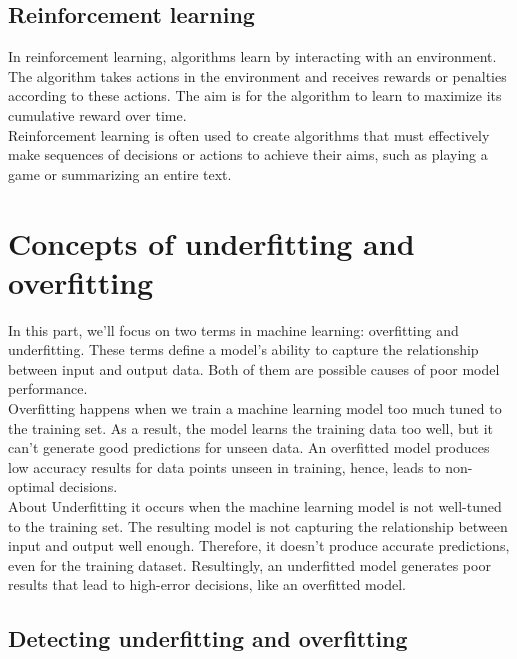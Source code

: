 \documentclass[
]{book}
\begin{document}
\hypertarget{reinforcement-learning}{%
\subsection*{Reinforcement learning}\label{reinforcement-learning}}

In reinforcement learning, algorithms learn by interacting with an environment. The algorithm takes actions in the environment and receives rewards or penalties according to these actions. The aim is for the algorithm to learn to maximize its cumulative reward over time.\\
Reinforcement learning is often used to create algorithms that must effectively make sequences of decisions or actions to achieve their aims, such as playing a game or summarizing an entire text.

\hypertarget{concepts-of-underfitting-and-overfitting}{%
\section{\texorpdfstring{Concepts of underfitting and overfitting\\
}{Concepts of underfitting and overfitting }}\label{concepts-of-underfitting-and-overfitting}}

In this part, we'll focus on two terms in machine learning: overfitting and underfitting. These terms define a model's ability to capture the relationship between input and output data. Both of them are possible causes of poor model performance.\\
Overfitting happens when we train a machine learning model too much tuned to the training set. As a result, the model learns the training data too well, but it can't generate good predictions for unseen data. An overfitted model produces low accuracy results for data points unseen in training, hence, leads to non-optimal decisions.\\
About Underfitting it occurs when the machine learning model is not well-tuned to the training set. The resulting model is not capturing the relationship between input and output well enough. Therefore, it doesn't produce accurate predictions, even for the training dataset. Resultingly, an underfitted model generates poor results that lead to high-error decisions, like an overfitted model.

\hypertarget{detecting-underfitting-and-overfitting}{%
\subsection{Detecting underfitting and overfitting}\label{detecting-underfitting-and-overfitting}}
\end{document}

